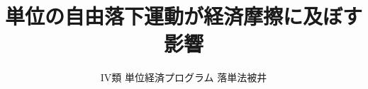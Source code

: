\title{単位の自由落下運動が経済摩擦に及ぼす影響}
\author{IV類 単位経済プログラム 落単法被井}



\begin{frame}
    \titlepage %
\end{frame}

